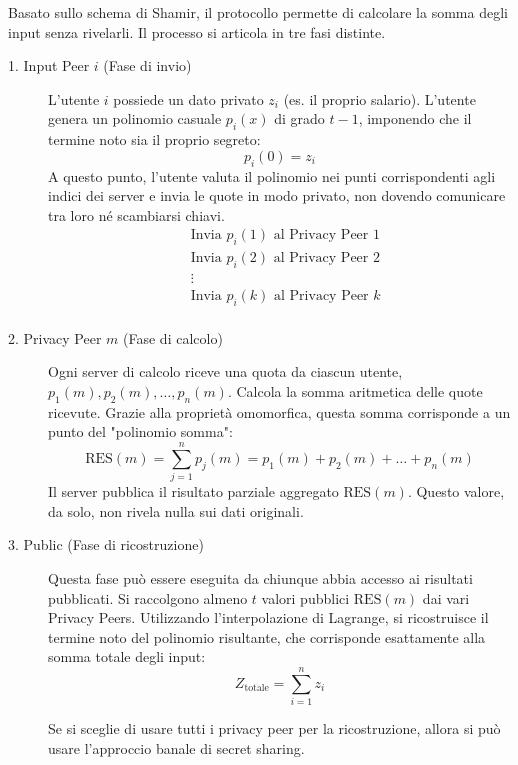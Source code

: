 \documentclass[a4paper, 11pt]{article}
\begin{document}
Basato sullo schema di Shamir, il protocollo permette di calcolare la somma degli input senza rivelarli. Il processo si articola in tre fasi distinte.

\begin{description}
    \item[1. Input Peer $i$ (Fase di invio)] 
    L'utente $i$ possiede un dato privato $z_i$ (es. il proprio salario).
    L'utente genera un polinomio casuale $p_i(x)$ di grado $t-1$, imponendo che il termine noto sia il proprio segreto:
    \[
        p_i(0) = z_i
    \]
    A questo punto, l'utente valuta il polinomio nei punti corrispondenti agli indici dei server e invia le quote in modo privato, non dovendo comunicare tra loro né scambiarsi chiavi.
    \begin{align*}        
        &\text{Invia $p_i(1)$ al Privacy Peer 1} \\
        &\text{Invia $p_i(2)$ al Privacy Peer 2} \\
        &\vdots \\ 
        &\text{Invia $p_i(k)$ al Privacy Peer $k$} \\ 
    \end{align*}
    \item[2. Privacy Peer $m$ (Fase di calcolo)]
    Ogni server di calcolo riceve una quota da ciascun utente, $p_1(m), p_2(m), \dots, p_n(m)$.
    Calcola la somma aritmetica delle quote ricevute. Grazie alla proprietà omomorfica, questa somma corrisponde a un punto del "polinomio somma":
    \[
        \text{RES}(m) = \sum_{j=1}^{n} p_j(m) = p_1(m) + p_2(m) + \dots + p_n(m)
    \]
    Il server pubblica il risultato parziale aggregato $\text{RES}(m)$. Questo valore, da solo, non rivela nulla sui dati originali.
    \item[3. Public (Fase di ricostruzione)]
    Questa fase può essere eseguita da chiunque abbia accesso ai risultati pubblicati. Si raccolgono almeno $t$ valori pubblici $\text{RES}(m)$ dai vari Privacy Peers. Utilizzando l'interpolazione di Lagrange, si ricostruisce il termine noto del polinomio risultante, che corrisponde esattamente alla somma totale degli input:
    \[
        Z_{\text{totale}} = \sum_{i=1}^{n} z_i
    \]

    Se si sceglie di usare tutti i privacy peer per la ricostruzione, allora si può usare l'approccio banale di secret sharing.
\end{description}

\newpage
\end{document}
